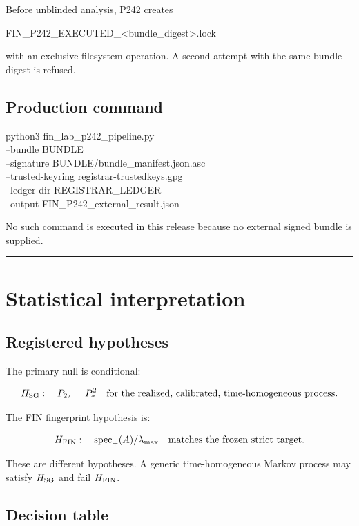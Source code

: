 \documentclass[11pt,a4paper,openany]{report}
\begin{document}
Before unblinded analysis, P242 creates

FIN\_P242\_EXECUTED\_<bundle\_digest>.lock

with an exclusive filesystem operation. A second attempt with the same bundle digest is refused.

\section{Production command}

python3 fin\_lab\_p242\_pipeline.py \\
--bundle BUNDLE \\
--signature BUNDLE/\allowbreak{}bundle\_manifest.json.asc \\
--trusted-keyring registrar-trustedkeys.gpg \\
--ledger-dir REGISTRAR\_LEDGER \\
--output FIN\_P242\_external\_result.json

No such command is executed in this release because no external signed bundle is supplied.

\par\medskip\hrule\medskip

\chapter{Statistical interpretation}

\section{Registered hypotheses}

The primary null is conditional:

\[
H_{\rm SG}:
\quad
P_{2\tau}=P_\tau^2
\quad
\text{for the realized, calibrated, time-homogeneous process}.
\]

The FIN fingerprint hypothesis is:

\[
H_{\rm FIN}:
\quad
\operatorname{spec}_+(A)/\lambda_{\max}
\quad
\text{matches the frozen strict target}.
\]

These are different hypotheses. A generic time-homogeneous Markov process may satisfy \(H_{\rm SG}\) and fail \(H_{\rm FIN}\).

\section{Decision table}
\end{document}
